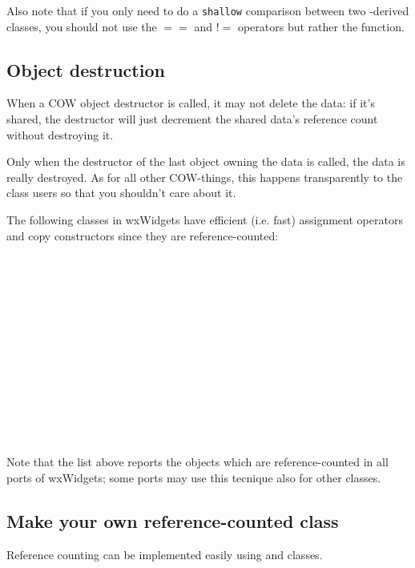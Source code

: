 Also note that if you only need to do a {\tt shallow} comparison between two
-derived classes, you should not use the $==$ and $!=$ operators
but rather the  function.


\subsection{Object destruction}\label{refcountdestruct}

When a COW object destructor is called, it may not delete the data: if it's shared,
the destructor will just decrement the shared data's reference count without destroying it.

Only when the destructor of the last object owning the data is called, the data is really
destroyed. As for all other COW-things, this happens transparently to the class users so
that you shouldn't care about it.


The following classes in wxWidgets have efficient (i.e. fast) assignment operators
and copy constructors since they are reference-counted:

\\
\\
\\
\\
\\
\\
\\
\\
\\
\\
\\
\\

Note that the list above reports the objects which are reference-counted in all ports of
wxWidgets; some ports may use this tecnique also for other classes.
\subsection{Make your own reference-counted class}\label{wxobjectoverview}

Reference counting can be implemented easily using 
and  classes.

